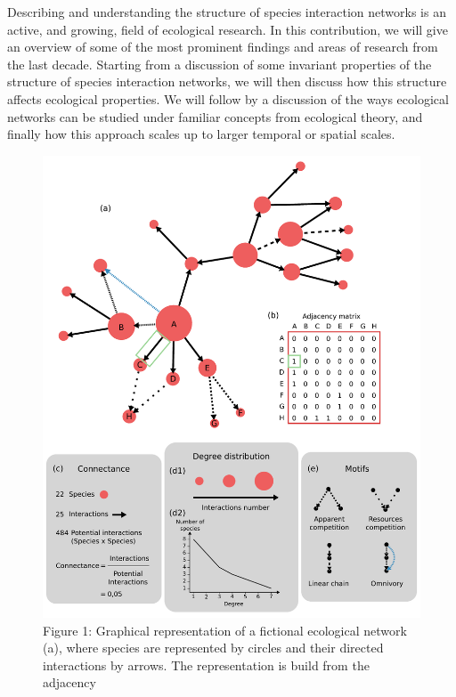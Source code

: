 \documentclass[12pt]{article}
\begin{document}
Describing and understanding the structure of species interaction
networks is an active, and growing, field of ecological research. In
this contribution, we will give an overview of some of the most
prominent findings and areas of research from the last decade. Starting
from a discussion of some invariant properties of the structure of
species interaction networks, we will then discuss how this structure
affects ecological properties. We will follow by a discussion of the
ways ecological networks can be studied under familiar concepts from
ecological theory, and finally how this approach scales up to larger
temporal or spatial scales.

\begin{no-prefix-figure-caption}

\begin{figure}
\centering
\includegraphics[width=1.00000\textwidth]{Figures/figure1.pdf}
\caption{Figure 1: Graphical representation of a fictional ecological
network (a), where species are represented by circles and their directed
interactions by arrows. The representation is build from the adjacency
}
\end{figure}
\end{no-prefix-figure-caption}
\end{document}
